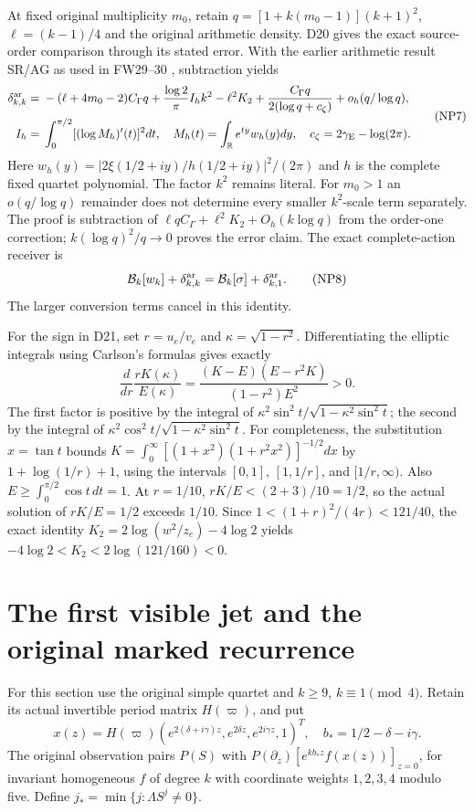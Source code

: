\documentclass[11pt]{article}
\newcommand{\R}{\mathbb R}
\begin{document}
At fixed original multiplicity $m_0$, retain
$q=[1+k(m_0-1)](k+1)^2$, $\ell=(k-1)/4$ and the original
arithmetic density. D20 gives the exact source-order comparison
through its stated error. With the earlier arithmetic result SR/AG
as used in FW29--30 \cite{FW}, subtraction yields
\[
\begin{aligned}
\delta_{k,k}^{\rm ar}={}&-(\ell+4m_0-2)C_\Gamma q
+\frac{\log2}{\pi}I_hk^2-\ell^2K_2
+\frac{C_\Gamma q}{2(\log q+c_\zeta)}+o_h(q/\log q),\\
 I_h={}&\int_0^{\pi/2}[(\log M_h)'(t)]^2dt,
\quad M_h(t)=\int_{\R}e^{ty}w_h(y)dy,
\quad c_\zeta=2\gamma_{\rm E}-\log(2\pi).
\end{aligned}\tag{NP7}
\]
Here $w_h(y)=|2\xi(1/2+iy)/h(1/2+iy)|^2/(2\pi)$ and $h$ is
the complete fixed quartet polynomial. The factor $k^2$ remains
literal. For $m_0>1$ an $o(q/\log q)$ remainder does not determine
every smaller $k^2$-scale term separately. The proof is subtraction of
$\ell qC_\Gamma+\ell^2K_2+O_h(k\log q)$ from the order-one
correction; $k(\log q)^2/q\to0$ proves the error claim. The exact
complete-action receiver is
\[
 \mathcal B_k[w_k]+\delta_{k,k}^{\rm ar}
       =\mathcal B_k[\sigma]+\delta_{k,1}^{\rm ar}. \tag{NP8}
\]
The larger conversion terms cancel in this identity.

For the sign in D21, set $r=u_e/v_e$ and $\kappa=\sqrt{1-r^2}$.
Differentiating the elliptic integrals using Carlson's formulas
\cite[19.4.1--2]{Carlson} gives exactly
\[
 \frac{d}{dr}\frac{rK(\kappa)}{E(\kappa)}
 =\frac{(K-E)(E-r^2K)}{(1-r^2)E^2}>0. \tag{NP9}
\]
The first factor is positive by the integral of
$\kappa^2\sin^2t/\sqrt{1-\kappa^2\sin^2t}$; the second by the
integral of $\kappa^2\cos^2t/\sqrt{1-\kappa^2\sin^2t}$.
For completeness, the substitution $x=\tan t$ bounds
$K=\int_0^\infty[(1+x^2)(1+r^2x^2)]^{-1/2}dx$
by $1+\log(1/r)+1$, using the intervals $[0,1]$, $[1,1/r]$,
and $[1/r,\infty)$. Also $E\ge\int_0^{\pi/2}\cos t\,dt=1$.
At $r=1/10$, $rK/E<(2+3)/10=1/2$, so the actual solution
of $rK/E=1/2$ exceeds $1/10$. Since
$1<(1+r)^2/(4r)<121/40$, the exact identity
$K_2=2\log(w^2/z_e)-4\log2$ yields
$-4\log2<K_2<2\log(121/160)<0$.

\section{The first visible jet and the original marked recurrence}
For this section use the original simple quartet and $k\ge9$,
$k\equiv1\pmod4$. Retain its actual invertible period matrix
$H(\varpi)$, and put
\[
 x(z)=H(\varpi)(e^{2(\delta+i\gamma)z},e^{2\delta z},
 e^{2i\gamma z},1)^T,\quad b_*=1/2-\delta-i\gamma.
 \tag{NP10}
\]
The original observation pairs $P(S)$ with
$P(\partial_z)[e^{kb_*z}f(x(z))]_{z=0}$, for invariant homogeneous
$f$ of degree $k$ with coordinate weights $1,2,3,4$ modulo five.
Define $j_* =\min\{j:\Lambda S^j\ne0\}$.
\end{document}
